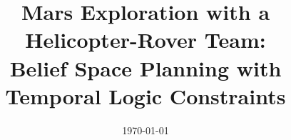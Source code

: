 \documentclass[letterpaper]{article} %
\begin{document}

\title{\huge Mars Exploration with a Helicopter-Rover Team:\\
Belief Space Planning with Temporal Logic Constraints}




\author{\today}




% 
\end{document}
